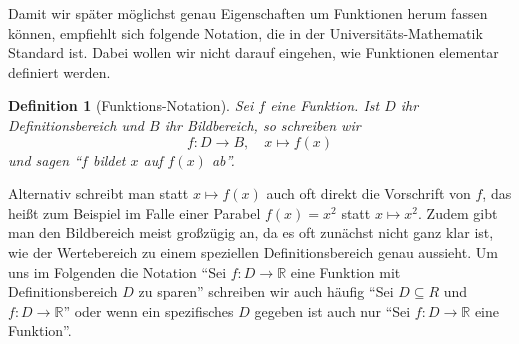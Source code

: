 \documentclass[11pt,reqno, a4paper]{book}
\theoremstyle{mystyle}
\newtheorem{definition}[theorem]{Definition}
\theoremstyle{definition}
\numberwithin{equation}{chapter}
\begin{document}
Damit wir später möglichst genau Eigenschaften um Funktionen herum fassen können, empfiehlt sich folgende Notation, die in der Universitäts-Mathematik Standard ist. Dabei wollen wir nicht darauf eingehen, wie Funktionen elementar definiert werden. 
\begin{definition}[Funktions-Notation]
    Sei \(f\) eine Funktion. Ist \(D\) ihr Definitionsbereich und \(B\) ihr Bildbereich, so schreiben wir 
    \begin{equation*}
        f:D \to B, \quad x \mapsto f(x)
    \end{equation*}
    und sagen "`\(f\) bildet \(x\) auf \(f(x)\) ab"'.
\end{definition}
Alternativ schreibt man statt \(x \mapsto f(x)\) auch oft direkt die Vorschrift von \(f\), das heißt zum Beispiel im Falle einer Parabel \(f(x) = x^2\) statt \(x \mapsto x^2\). Zudem gibt man den  Bildbereich meist großzügig an, da es oft zunächst nicht ganz klar ist, wie der Wertebereich zu einem speziellen Definitionsbereich genau aussieht. Um uns im Folgenden die Notation "`Sei \(f:D\to \mathbb R\) eine Funktion mit Definitionsbereich \(D\) zu sparen"' schreiben wir auch häufig "`Sei \(D\subseteq R\) und \(f:D\to\mathbb R\)"' oder wenn ein spezifisches \(D\) gegeben ist auch nur "`Sei \(f:D\to\mathbb R\) eine Funktion"'. 
\end{document}
